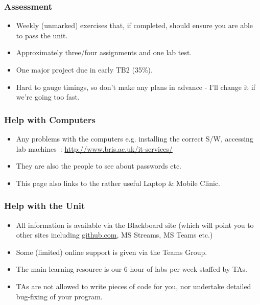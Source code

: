 \begin{frame}%
\frametitle{Assessment}
\begin{itemize}[<+->]
\item Weekly (unmarked) exercises that, if completed, should ensure you are able to pass the unit.
\item Approximately three/four assignments and one lab test.
\item One major project due in early TB2 (35\%).
\item Hard to gauge timings, so don't make any plans in advance -
I'll change it if we're going too fast.
\end{itemize}
\end{frame}


\begin{frame}%
\frametitle{Help with Computers}
\begin{itemize}[<+->]
\item Any problems with the computers e.g. installing the correct S/W, accessing lab machines~: \url{http://www.bris.ac.uk/it-services/}
\item They are also the people to see about passwords etc.
\item This page also links to the rather useful Laptop \& Mobile Clinic.
\end{itemize}
\end{frame}

\begin{frame}%
\frametitle{Help with the Unit}
\begin{itemize}[<+->]
\item All information is available via the Blackboard site (which will point you to other sites including \url{github.com}, MS Streams, MS Teams etc.)
\item Some (limited) online support is given via the Teams Group.
\item The main learning resource is our 6 hour of labs per week staffed by TAs.
\item TAs are not allowed to write pieces of code for you,
nor undertake detailed bug-fixing of your program.
\end{itemize}
\end{frame}
